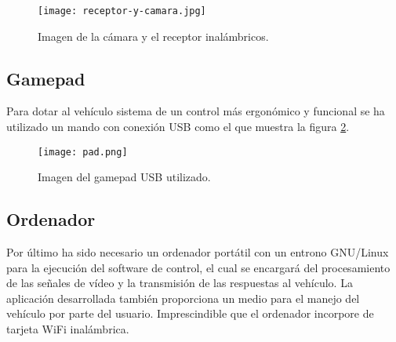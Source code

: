 \begin{figure}[H]
  \begin{center}
    \texttt{[image: receptor-y-camara.jpg]}
  \end{center}
  \caption{Imagen de la cámara y el receptor inalámbricos.}
  \label{imagen-pad}
\end{figure}


\subsection{Gamepad}

Para dotar al vehículo sistema de un control más ergonómico y funcional se ha utilizado un mando con conexión USB como el que muestra la figura \ref{imagen-pad}.\\

\begin{figure}[H]
  \begin{center}
    \texttt{[image: pad.png]}
  \end{center}
  \caption{Imagen del gamepad USB utilizado.}
  \label{imagen-pad}
\end{figure}

\subsection{Ordenador}

Por último ha sido necesario un ordenador portátil con un entrono GNU/Linux para la ejecución del software de control, el cual se encargará del procesamiento de las señales de vídeo y la transmisión de las respuestas al vehículo. La aplicación desarrollada también proporciona un medio para el manejo del vehículo por parte del usuario. Imprescindible que el ordenador incorpore de tarjeta WiFi inalámbrica.\\

